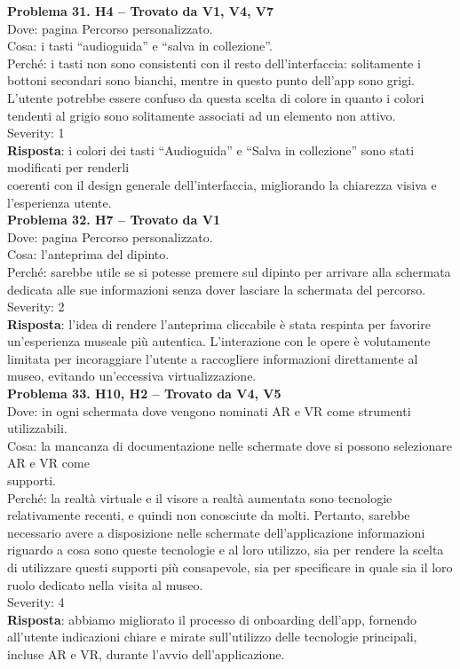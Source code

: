 \documentclass{article}
\begin{document}
\noindent \textbf{Problema 31. H4 – Trovato da V1, V4, V7} \\
Dove: pagina Percorso personalizzato. \\
Cosa: i tasti “audioguida” e “salva in collezione”. \\
Perché: i tasti non sono consistenti con il resto dell’interfaccia: solitamente i bottoni secondari sono bianchi, mentre in questo punto dell’app sono grigi. L’utente potrebbe essere confuso da questa scelta di colore in quanto i colori tendenti al grigio sono solitamente associati ad un elemento non attivo. \\
Severity: 1 \\
\textbf{Risposta}: i colori dei tasti “Audioguida” e “Salva in collezione” sono stati modificati per renderli \\ coerenti con il design generale dell’interfaccia, migliorando la chiarezza visiva e l’esperienza utente.\\

\noindent \textbf{Problema 32. H7 – Trovato da V1} \\
Dove: pagina Percorso personalizzato. \\
Cosa: l’anteprima del dipinto. \\
Perché: sarebbe utile se si potesse premere sul dipinto per arrivare alla schermata dedicata alle sue informazioni senza dover lasciare la schermata del percorso. \\
Severity: 2 \\
\textbf{Risposta}: l’idea di rendere l’anteprima cliccabile è stata respinta per favorire un’esperienza museale più autentica. L’interazione con le opere è volutamente limitata per incoraggiare l’utente a raccogliere informazioni direttamente al museo, evitando un’eccessiva virtualizzazione.\\

\noindent \textbf{Problema 33. H10, H2 – Trovato da V4, V5} \\
Dove: in ogni schermata dove vengono nominati AR e VR come strumenti utilizzabili. \\
Cosa: la mancanza di documentazione nelle schermate dove si possono selezionare AR e VR come \\supporti. \\
Perché: la realtà virtuale e il visore a realtà aumentata sono tecnologie relativamente recenti, e quindi non conosciute da molti. Pertanto, sarebbe necessario avere a disposizione nelle schermate dell’applicazione informazioni riguardo a cosa sono queste tecnologie e al loro utilizzo, sia per rendere la scelta di utilizzare questi supporti più consapevole, sia per specificare in quale sia il loro ruolo dedicato nella visita al museo. \\
Severity: 4 \\
\textbf{Risposta}: abbiamo migliorato il processo di onboarding dell’app, fornendo all’utente indicazioni chiare e mirate sull’utilizzo delle tecnologie principali, incluse AR e VR, durante l’avvio dell’applicazione.\\
\end{document}

